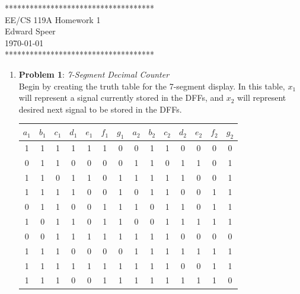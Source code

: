 \documentclass{article}
\newcommand{\HWNUM}{1}
\begin{document}

    \begin{center}
        ************************************ \\
        EE/CS 119A Homework \HWNUM \\
        Edward Speer \\
        \today \\
        ************************************
    \end{center}

    \begin{enumerate}
    
        \item \textbf{Problem 1}: \emph{7-Segment Decimal Counter} \\
            
            Begin by creating the truth table for the 7-segment display. In this
            table, $x_1$ will represent a signal currently stored in the DFFs,
            and $x_2$ will represent desired next signal to be stored in the
            DFFs.

            \begin{center}
                \begin{tabular}{|c c c c c c c|c c c c c c c|}
                \hline
                $a_1$&$b_1$&$c_1$&$d_1$&$e_1$&$f_1$&$g_1$&
                $a_2$&$b_2$&$c_2$&$d_2$&$e_2$&$f_2$&$g_2$\\
                \hline
                1&1&1&1&1&1&0& 0&1&1&0&0&0&0\\
                0&1&1&0&0&0&0& 1&1&0&1&1&0&1\\
                1&1&0&1&1&0&1& 1&1&1&1&0&0&1\\
                1&1&1&1&0&0&1& 0&1&1&0&0&1&1\\
                0&1&1&0&0&1&1& 1&0&1&1&0&1&1\\
                1&0&1&1&0&1&1& 0&0&1&1&1&1&1\\
                0&0&1&1&1&1&1& 1&1&1&0&0&0&0\\
                1&1&1&0&0&0&0& 1&1&1&1&1&1&1\\
                1&1&1&1&1&1&1& 1&1&1&0&0&1&1\\
                1&1&1&0&0&1&1& 1&1&1&1&1&1&0\\
                \hline
                \end{tabular}
            \end{center}


\end{enumerate}
\end{document}
